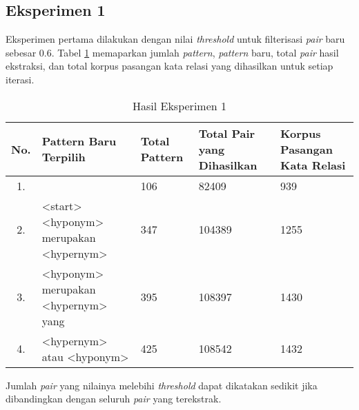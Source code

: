 \subsection{Eksperimen 1}
Eksperimen pertama dilakukan dengan nilai \textit{threshold} untuk filterisasi \textit{pair} baru sebesar 0.6. Tabel \ref{table:eksp1} memaparkan jumlah \textit{pattern}, \textit{pattern} baru, total \textit{pair} hasil ekstraksi, dan total korpus pasangan kata relasi yang dihasilkan untuk setiap iterasi.
\begin{table}
  \centering
  \caption{Hasil Eksperimen 1}
  \label{table:eksp1}
  \begin{tabular}{|c|m{14em}|m{4em}|m{4em}|m{4em}|}
    \hline
      No. & Pattern Baru Terpilih & Total Pattern & Total Pair yang Dihasilkan & Korpus Pasangan Kata Relasi \\ \hline
      1.  &                                            & 106  &  82409   &  939 \\ \hline
      2.  & <start> <hyponym> merupakan <hypernym>     & 347  &  104389  &  1255 \\ \hline
      3.  & <hyponym> merupakan <hypernym> yang        & 395  &  108397  &  1430 \\ \hline
      4.  & <hypernym> atau <hyponym>                  & 425  &  108542  &  1432 \\ \hline
  \end{tabular}
\end{table}

\noindent Jumlah \textit{pair} yang nilainya melebihi \textit{threshold} dapat dikatakan sedikit jika dibandingkan dengan seluruh \textit{pair} yang terekstrak. 

